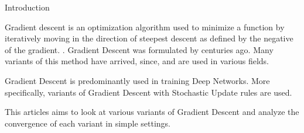 \documentclass{article}
\begin{document}
\makeheader
{}

\begin{psection}{Introduction}

	Gradient descent is an optimization algorithm used to minimize a function by iteratively moving in the direction of steepest descent as defined by the negative of the gradient. \citep{gd-overview}. Gradient Descent was formulated by \cite{gd-original} centuries ago. Many variants of this method have arrived, since, and are used in various fields.

	Gradient Descent is predominantly used in training Deep Networks. More specifically, variants of Gradient Descent with Stochastic Update rules are used.

	This articles aims to look at various variants of Gradient Descent and analyze the convergence of each variant in simple settings.

\end{psection}
\end{document}
